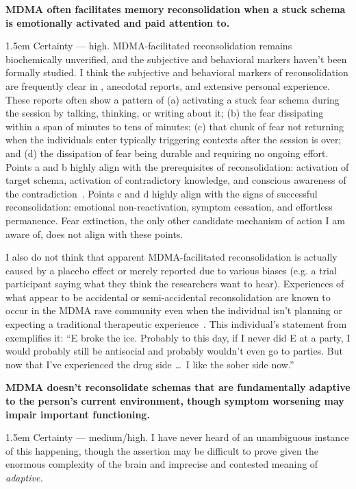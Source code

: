 \documentclass[11pt,oneside]{book}
\let\cite\parencite
\newcommand{\claim}[2]{%
    \par\medskip\noindent\textbf{#1}%
    \begin{adjustwidth}{1.5em}{}%
    \setlength{\parindent}{0pt}%
    \setlength{\parskip}{0.5\baselineskip}%
    #2%
    \end{adjustwidth}%
}
\begin{document}
\claim{MDMA often facilitates memory reconsolidation when a stuck schema is emotionally activated and paid attention to.}{Certainty --- high. MDMA-facilitated reconsolidation remains biochemically unverified, and the subjective and behavioral markers haven't been formally studied. I think the subjective and behavioral markers of reconsolidation are frequently clear in \textcite{fedduciaMDMAMemoryReconsolidation}, anecdotal reports, and extensive personal experience. These reports often show a pattern of (a) activating a stuck fear schema during the session by talking, thinking, or writing about it; (b) the fear dissipating within a span of minutes to tens of minutes; (c) that chunk of fear not returning when the individuals enter typically triggering contexts after the session is over; and (d) the dissipation of fear being durable and requiring no ongoing effort. Points a and b highly align with the prerequisites of reconsolidation: activation of target schema, activation of contradictory knowledge, and conscious awareness of the contradiction~\cite{eckerUnlocking}. Points c and d highly align with the signs of successful reconsolidation: emotional non-reactivation, symptom cessation, and effortless permanence. Fear extinction, the only other candidate mechanism of action I am aware of, does not align with these points.

I also do not think that apparent MDMA-facilitated reconsolidation is actually caused by a placebo effect or merely reported due to various biases (e.g. a trial participant saying what they think the researchers want to hear). Experiences of what appear to be accidental or semi-accidental reconsolidation are known to occur in the MDMA rave community even when the individual isn't planning or expecting a traditional therapeutic experience~\cite{huntEcstacy}. This individual's statement from \textcite[p. 344]{huntEcstacy} exemplifies it: \enquote{E broke the ice. Probably to this day, if I never did E at a party, I would probably still be antisocial and probably wouldn't even go to parties. But now that I've experienced the drug side \dots\ I like the sober side now.}}
\claim{MDMA doesn't reconsolidate schemas that are fundamentally adaptive to the person's current environment, though symptom worsening may impair important functioning.}{Certainty --- medium/high. I have never heard of an unambiguous instance of this happening, though the assertion may be difficult to prove given the enormous complexity of the brain and imprecise and contested meaning of \textit{adaptive.}}
\end{document}
